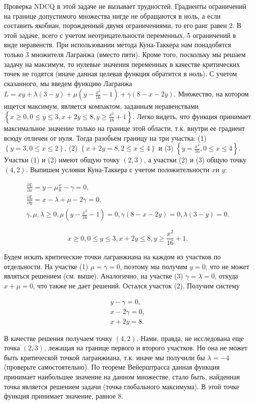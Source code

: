 \begin{solution}
Проверка NDCQ в этой задаче не вызывает трудностей. Градиенты ограничений на границе допустимого множества нигде не обращаются в ноль, а если составить якобиан, порожденный двумя ограничениями, то его ранг равен 2. В этой задаче, всего с учетом неотрицательности переменных, 5 ограничений в виде неравенств. При использовании метода Куна-Таккера нам понадобятся только 3 множителя Лагранжа (вместо пяти). Кроме того, поскольку мы решаем задачу на максимум, то нулевые значения переменных в качестве критических точек не годятся (иначе данная целевая функция обратится в ноль). С учетом сказанного, мы введем функцию Лагранжа $L=xy+\lambda (3-y)+\mu (y-\frac{x^{2} }{16} -1)+\gamma (8-x-2y)$. Множество, на котором ищется максимум, является компактом, заданным неравенствами $\left\{\right. x\ge 0,  0\le y\le 3,  x+2y\le 8,  y\ge \frac{x^{2} }{16} +1\left. \right\}$. Легко видеть, что функция принимает максимальное значение только на границе этой области, т.к. внутри ее градиент всюду отличен от нуля. Тогда разобьем границу на три участка: (1) $\left\{y=3,  0\le x\le 2\right\}$, (2) $\left\{x+2y=8,  2\le x\le 4\right\}$ и (3) $\left\{y=\frac{x^{2} }{16} ,  0\le x\le 4\right\}$. Участки (1) и (2) имеют общую точку $(2,3)$, а участки (2) и (3) общую точку $(4,2)$. Выпишем условия Куна-Таккера с учетом положительности $x$и $y$:

\[\begin{array}{l} {\frac{\partial L}{\partial x} =y-\mu \frac{x}{8} -\gamma =0,} \\ {\frac{\partial L}{\partial y} =x-\lambda +\mu -2\gamma =0,} \\ {\gamma ,\mu ,\lambda \ge 0,  \mu (y-\frac{x^{2} }{16} -1)=0,  \gamma (8-x-2y)=0,  \lambda (3-y)=0.} \end{array}\] 

\[x\ge 0,  0\le y\le 3,  x+2y\le 8,  y\ge \frac{x^{2} }{16} +1.\] 

Будем искать критические точки лагранжиана на каждом из участков по отдельности. На участке (1) $\mu =\gamma =0$, поэтому мы получим $y=0$, что не может являться решением (см. выше). Аналогично, на участке (3)  $\gamma =\lambda =0$, откуда $x+\mu =0$, что также не дает решений. Остался участок (2).  Получим систему

\[\begin{array}{l} {y-\gamma =0,} \\ {x-2\gamma =0,} \\ {x+2y=8.} \end{array}\] 

В качестве решения получаем точку $(4,2)$. Нами, правда, не исследована еще точка $(2,3)$, лежащая на границе первого и второго участков. Но она не может быть критической точкой лагранжиана, т.к. иначе мы получили бы $\lambda =-4$ (проверьте самостоятельно). По теореме Вейерштрасса данная функция принимает наибольшее значение на данном множестве, стало быть, найденная точка является решением задачи (точка глобального максимума). В этой точке функция принимает значение, равное 8.
\end{solution}

